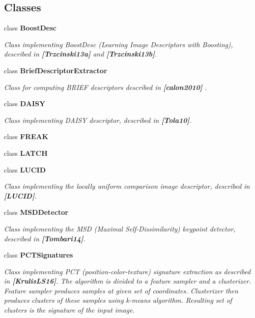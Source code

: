 \subsection*{Classes}
\begin{DoxyCompactItemize}
\item 
class {\bfseries Boost\+Desc}
\begin{DoxyCompactList}\small\item\em Class implementing Boost\+Desc (Learning Image Descriptors with Boosting), described in {\bfseries [Trzcinski13a]} and {\bfseries [Trzcinski13b]}. \end{DoxyCompactList}\item 
class {\bfseries Brief\+Descriptor\+Extractor}
\begin{DoxyCompactList}\small\item\em Class for computing B\+R\+I\+EF descriptors described in {\bfseries [calon2010]} . \end{DoxyCompactList}\item 
class {\bfseries D\+A\+I\+SY}
\begin{DoxyCompactList}\small\item\em Class implementing D\+A\+I\+SY descriptor, described in {\bfseries [Tola10]}. \end{DoxyCompactList}\item 
class {\bfseries F\+R\+E\+AK}
\item 
class {\bfseries L\+A\+T\+CH}
\item 
class {\bfseries L\+U\+C\+ID}
\begin{DoxyCompactList}\small\item\em Class implementing the locally uniform comparison image descriptor, described in {\bfseries [L\+U\+C\+ID]}. \end{DoxyCompactList}\item 
class {\bfseries M\+S\+D\+Detector}
\begin{DoxyCompactList}\small\item\em Class implementing the M\+SD ({\itshape Maximal Self-\/\+Dissimilarity}) keypoint detector, described in {\bfseries [Tombari14]}. \end{DoxyCompactList}\item 
class {\bfseries P\+C\+T\+Signatures}
\begin{DoxyCompactList}\small\item\em Class implementing P\+CT (position-\/color-\/texture) signature extraction as described in {\bfseries [Krulis\+L\+S16]}. The algorithm is divided to a feature sampler and a clusterizer. Feature sampler produces samples at given set of coordinates. Clusterizer then produces clusters of these samples using k-\/means algorithm. Resulting set of clusters is the signature of the input image. \end{DoxyCompactList}\item 

\end{DoxyCompactItemize}
